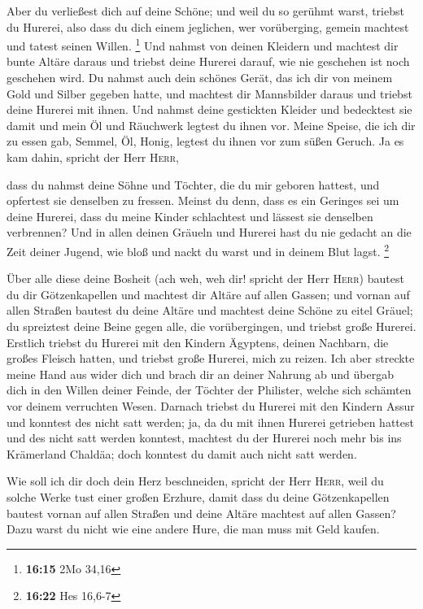  Aber du verließest dich auf deine Schöne; und weil du so
gerühmt warst, triebst du Hurerei, also dass du dich einem jeglichen,
wer vorüberging, gemein machtest und tatest seinen Willen. \footnote{\textbf{16:15}
  2Mo 34,16}  Und nahmst von deinen Kleidern und machtest
dir bunte Altäre daraus und triebst deine Hurerei darauf, wie nie
geschehen ist noch geschehen wird.  Du nahmst auch dein
schönes Gerät, das ich dir von meinem Gold und Silber gegeben hatte, und
machtest dir Mannsbilder daraus und triebst deine Hurerei mit ihnen.
 Und nahmst deine gestickten Kleider und bedecktest sie
damit und mein Öl und Räuchwerk legtest du ihnen vor. 
Meine Speise, die ich dir zu essen gab, Semmel, Öl, Honig, legtest du
ihnen vor zum süßen Geruch. Ja es kam dahin, spricht der Herr
\textsc{Herr},

 dass du nahmst deine Söhne und Töchter, die du mir
geboren hattest, und opfertest sie denselben zu fressen. Meinst du denn,
dass es ein Geringes sei um deine Hurerei,  dass du meine
Kinder schlachtest und lässest sie denselben verbrennen? 
Und in allen deinen Gräueln und Hurerei hast du nie gedacht an die Zeit
deiner Jugend, wie bloß und nackt du warst und in deinem Blut lagst.
\footnote{\textbf{16:22} Hes 16,6-7}

 Über alle diese deine Bosheit (ach weh, weh dir! spricht
der Herr \textsc{Herr})  bautest du dir Götzenkapellen
und machtest dir Altäre auf allen Gassen;  und vornan auf
allen Straßen bautest du deine Altäre und machtest deine Schöne zu eitel
Gräuel; du spreiztest deine Beine gegen alle, die vorübergingen, und
triebst große Hurerei.  Erstlich triebst du Hurerei mit
den Kindern Ägyptens, deinen Nachbarn, die großes Fleisch hatten, und
triebst große Hurerei, mich zu reizen.  Ich aber streckte
meine Hand aus wider dich und brach dir an deiner Nahrung ab und übergab
dich in den Willen deiner Feinde, der Töchter der Philister, welche sich
schämten vor deinem verruchten Wesen.  Darnach triebst du
Hurerei mit den Kindern Assur und konntest des nicht satt werden; ja, da
du mit ihnen Hurerei getrieben hattest und des nicht satt werden
konntest,  machtest du der Hurerei noch mehr bis ins
Krämerland Chaldäa; doch konntest du damit auch nicht satt werden.

 Wie soll ich dir doch dein Herz beschneiden, spricht der
Herr \textsc{Herr}, weil du solche Werke tust einer großen Erzhure,
 damit dass du deine Götzenkapellen bautest vornan auf
allen Straßen und deine Altäre machtest auf allen Gassen? Dazu warst du
nicht wie eine andere Hure, die man muss mit Geld kaufen.

